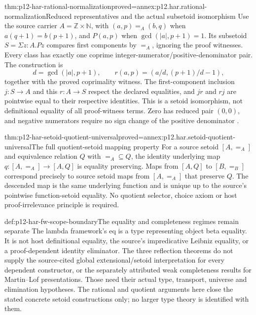 \begin{hbtheorem}{thm:p12-har-rational-normalization}{proved=annex:p12.har.rational-normalization}{Reduced representatives and the actual subsetoid isomorphism}
Use the source carrier \(A=\mathbb Z\times\mathbb N\), with
\((a,p)=_A(b,q)\) when \(a(q+1)=b(p+1)\), and
\(P(a,p)\) when \(\gcd(|a|,p+1)=1\). Its subsetoid
\(S=\Sigma z:A.Pz\) compares first components by \(=_A\),
ignoring the proof witnesses. Every class has exactly one coprime
integer-numerator/positive-denominator pair. The construction is
\[
 d=\gcd(|a|,p+1),\qquad
 r(a,p)=\left(a/d,(p+1)/d-1\right),
\]
together with the proved coprimality witness. The first-component
inclusion \(j:S\to A\) and this \(r:A\to S\) respect the
declared equalities, and \(jr\) and \(rj\) are pointwise equal
to their respective identities. This is a setoid isomorphism, not
definitional equality of all proof-witness terms. Zero has reduced pair
\((0,0)\), and negative numerators require no sign change of the
positive denominator \cite[p.~1173]{BarendregtGeuvers2001}.
\end{hbtheorem}

\begin{hbtheorem}{thm:p12-har-setoid-quotient-universal}{proved=annex:p12.har.setoid-quotient-universal}{The full quotient-setoid mapping property}
For a source setoid \([A,=_A]\) and equivalence relation \(Q\)
with \(=_A\subseteq Q\), the identity underlying map
\(q:[A,=_A]\to[A,Q]\) is equality preserving. Maps from
\([A,Q]\) to \([B,=_B]\) correspond precisely to source
setoid maps from \([A,=_A]\) that preserve \(Q\).
The descended map is the same underlying function and is unique up to
the source's pointwise function-setoid equality. No quotient selector,
choice axiom or host proof-irrelevance principle is required.
\end{hbtheorem}

\begin{proofboundary}{def:p12-har-fw-scope-boundary}{The equality and completeness regimes remain separate}
The lambda framework's \(\mathrm{eq}\) is a type representing
object beta equality. It is not host definitional equality, the
source's impredicative Leibniz equality, or a proof-dependent identity
eliminator. The three reflection theorems do not supply the source-cited
global extensional/setoid interpretation for every dependent constructor,
or the separately attributed weak completeness results for Martin--Lof
presentations. Those need their actual type, transport, universe and
elimination hypotheses. The rational and quotient arguments here close
the stated concrete setoid constructions only; no larger type theory
is identified with them.
\end{proofboundary}
